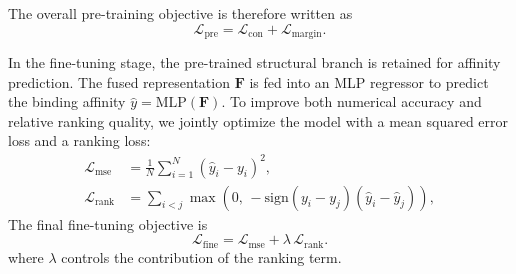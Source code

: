 \documentclass[unnumsec,webpdf,contemporary,large]{oup-authoring-template}%
\theoremstyle{thmstyleone}%
\theoremstyle{thmstyletwo}%
\theoremstyle{thmstylethree}%
\begin{document}
The overall pre-training objective is therefore written as
\begin{equation}
\mathcal{L}_{\mathrm{pre}}
=
\mathcal{L}_{\mathrm{con}} + \mathcal{L}_{\mathrm{margin}}.
\end{equation}

In the fine-tuning stage, the pre-trained structural branch is retained for affinity prediction. The fused representation $\mathbf{F}$ is fed into an MLP regressor to predict the binding affinity $\hat{y}=\mathrm{MLP}(\mathbf{F})$. To improve both numerical accuracy and relative ranking quality, we jointly optimize the model with a mean squared error loss and a ranking loss:
\begin{align}
\mathcal{L}_{\mathrm{mse}} &=
\frac{1}{N}\sum_{i=1}^{N}(\hat{y}_i-y_i)^2, \\
\mathcal{L}_{\mathrm{rank}} &=
\sum_{i<j}
\max\!\left(0,\,-\mathrm{sign}(y_i-y_j)(\hat{y}_i-\hat{y}_j)\right),
\end{align}
The final fine-tuning objective is
\begin{equation}
\mathcal{L}_{\mathrm{fine}}
=
\mathcal{L}_{\mathrm{mse}} + \lambda\,\mathcal{L}_{\mathrm{rank}}.
\end{equation}
where $\lambda$ controls the contribution of the ranking term.

\end{document}
